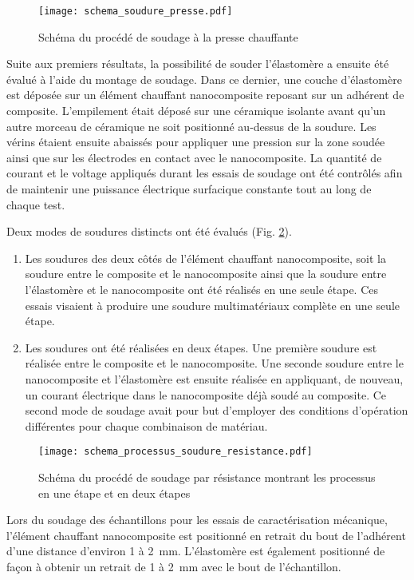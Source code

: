 \begin{figure}[h]
	\centering
	\texttt{[image: schema\_soudure\_presse.pdf]}
	\caption{Schéma du procédé de soudage à la presse chauffante}
	\label{fig:schema_soudure_presse}
\end{figure}

Suite aux premiers résultats, la possibilité de souder l'élastomère a ensuite été évalué à l'aide du montage de soudage. 
Dans ce dernier, une couche d'élastomère est déposée sur un élément chauffant nanocomposite reposant sur un adhérent de composite. 
L'empilement était déposé sur une céramique isolante avant qu'un autre morceau de céramique ne soit positionné au-dessus de la soudure. 
Les vérins étaient ensuite abaissés pour appliquer une pression sur la zone soudée ainsi que sur les électrodes en contact avec le nanocomposite. 
La quantité de courant et le voltage appliqués durant les essais de soudage ont été contrôlés afin de maintenir une puissance électrique surfacique constante tout au long de chaque test. 

Deux modes de soudures distincts ont été évalués (Fig. \ref{fig:schema_processus_soudure_resistance}). 
\begin{enumerate}
	\item Les soudures des deux côtés de l'élément chauffant nanocomposite, soit la soudure entre le composite et le nanocomposite ainsi que la soudure entre l'élastomère et le nanocomposite ont été réalisés en une seule étape. 
	Ces essais visaient à produire une soudure multimatériaux complète en une seule étape. 
	\item Les soudures ont été réalisées en deux étapes. 
	Une première soudure est réalisée entre le composite et le nanocomposite. 
	Une seconde soudure entre le nanocomposite et l'élastomère est ensuite réalisée en appliquant, de nouveau, un courant électrique dans le nanocomposite déjà soudé au composite. 
	Ce second mode de soudage avait pour but d'employer des conditions d'opération différentes pour chaque combinaison de matériau. 
\end{enumerate}

\begin{figure}[h]
	\centering
	\texttt{[image: schema\_processus\_soudure\_resistance.pdf]}
	\caption{Schéma du procédé de soudage par résistance montrant les processus en une étape et en deux étapes}
	\label{fig:schema_processus_soudure_resistance}
\end{figure}

Lors du soudage des échantillons pour les essais de caractérisation mécanique, l'élément chauffant nanocomposite est positionné en retrait du bout de l'adhérent d'une distance d'environ 1 à \SI[locale=FR]{2}{\milli\metre}. 
L'élastomère est également positionné de façon à obtenir un retrait de 1 à \SI[locale=FR]{2}{\milli\metre} avec le bout de l'échantillon. 

